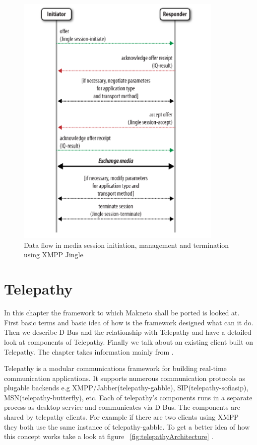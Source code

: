 \begin{figure}[ht]
\begin{center}
	\includegraphics[width=10cm]{fig/xmpp-jingle-flow.png}
	\caption{Data flow in media session initiation, management and termination using XMPP Jingle \cite{xmppBook}}
	\label{fig:xmppJingleDataFlow}
\end{center}
\end{figure}



\chapter{Telepathy}\label{chapter:telepathy}
In this chapter the framework to which Makneto shall be ported is looked at. First basic terms and basic idea of how is the framework designed what can it do. Then we describe D-Bus and the relationship with Telepathy and have a detailed look at components of Telepathy. Finally we talk about an existing client built on Telepathy. The chapter takes information mainly from \cite{TPWiki, dbus}. 

Telepathy \cite{telepathy} is a modular communications framework for building real-time communication applications. It supports numerous communication protocols as plugable backends e.g XMPP/Jabber(telepathy-gabble), SIP(telepathy-sofiasip), MSN(telepathy-butterfly), etc. Each of telepathy's components runs in a separate process as desktop service and communicates via D-Bus. The components are shared by telepathy clients. For example if there are two clients using XMPP they both use the same instance of telepathy-gabble. To get a better idea of how this concept works take a look at figure ~\ref{fig:telepathyArchitecture} \cite{TPWiki}.

